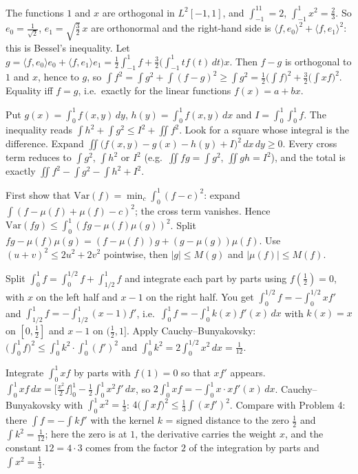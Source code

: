 \documentclass[11pt,a4paper]{article}
\begin{document}

 The functions $1$ and $x$ are orthogonal in $L^2[-1,1]$, and $\int_{-1}^11=2$, $\int_{-1}^1x^2=\frac23$. So $e_0=\frac1{\sqrt2}$, $e_1=\sqrt{\frac32}\,x$ are orthonormal and the right-hand side is $\langle f,e_0\rangle^2+\langle f,e_1\rangle^2$: this is Bessel's inequality.
 Let $g=\langle f,e_0\rangle e_0+\langle f,e_1\rangle e_1=\frac12\int_{-1}^1f+\frac32\big(\int_{-1}^1tf(t)\,dt\big)x$. Then $f-g$ is orthogonal to $1$ and $x$, hence to $g$, so $\int f^2=\int g^2+\int(f-g)^2\ge\int g^2=\frac12\big(\int f\big)^2+\frac32\big(\int xf\big)^2$. Equality iff $f=g$, i.e.\ exactly for the linear functions $f(x)=a+bx$.

 Put $g(x)=\int_0^1f(x,y)\,dy$, $h(y)=\int_0^1f(x,y)\,dx$ and $I=\int_0^1\!\int_0^1f$. The inequality reads $\int h^2+\int g^2\le I^2+\iint f^2$. Look for a square whose integral is the difference.
 Expand $\iint\big(f(x,y)-g(x)-h(y)+I\big)^2\,dx\,dy\ge0$. Every cross term reduces to $\int g^2$, $\int h^2$ or $I^2$ (e.g.\ $\iint fg=\int g^2$, $\iint gh=I^2$), and the total is exactly $\iint f^2-\int g^2-\int h^2+I^2$.

 First show that $\mathrm{Var}(f)=\min_c\int_0^1(f-c)^2$: expand $\int(f-\mu(f)+\mu(f)-c)^2$; the cross term vanishes.
 Hence $\mathrm{Var}(fg)\le\int_0^1(fg-\mu(f)\mu(g))^2$. Split $fg-\mu(f)\mu(g)=(f-\mu(f))g+(g-\mu(g))\mu(f)$.
 Use $(u+v)^2\le2u^2+2v^2$ pointwise, then $|g|\le M(g)$ and $|\mu(f)|\le M(f)$.

 Split $\int_0^1f=\int_0^{1/2}f+\int_{1/2}^1f$ and integrate each part by parts using $f(\frac12)=0$, with $x$ on the left half and $x-1$ on the right half.
 You get $\int_0^{1/2}f=-\int_0^{1/2}xf'$ and $\int_{1/2}^1f=-\int_{1/2}^1(x-1)f'$, i.e.\ $\int_0^1f=-\int_0^1k(x)f'(x)\,dx$ with $k(x)=x$ on $[0,\frac12]$ and $x-1$ on $(\frac12,1]$.
 Apply Cauchy--Bunyakovsky: $\big(\int_0^1f\big)^2\le\int_0^1k^2\cdot\int_0^1(f')^2$ and $\int_0^1k^2=2\int_0^{1/2}x^2\,dx=\frac1{12}$.

 Integrate $\int_0^1xf$ by parts with $f(1)=0$ so that $xf'$ appears.
 $\int_0^1xf\,dx=\big[\frac{x^2}2f\big]_0^1-\frac12\int_0^1x^2f'\,dx$, so $2\int_0^1xf=-\int_0^1x\cdot xf'(x)\,dx$.
 Cauchy--Bunyakovsky with $\int_0^1x^2=\frac13$: $4\big(\int xf\big)^2\le\frac13\int(xf')^2$. Compare with Problem 4: there $\int f=-\int kf'$ with the kernel $k$ = signed distance to the zero $\frac12$ and $\int k^2=\frac1{12}$; here the zero is at $1$, the derivative carries the weight $x$, and the constant $12=4\cdot3$ comes from the factor $2$ of the integration by parts and $\int x^2=\frac13$.
\end{document}
